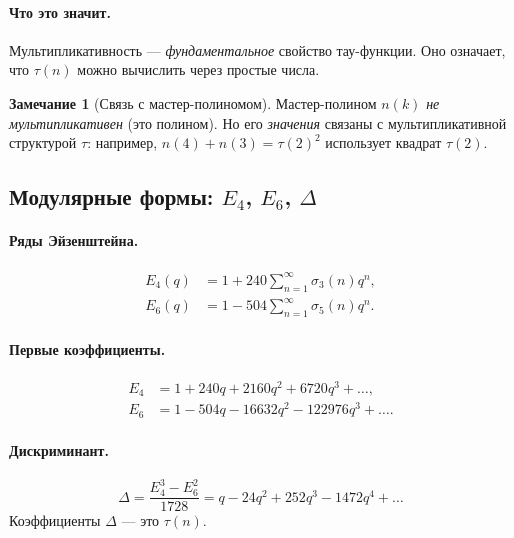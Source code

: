 \documentclass[11pt,a4paper]{article}
\theoremstyle{definition}
\newtheorem{remark}[theorem]{Замечание}
\begin{document}
\paragraph{Что это значит.}
Мультипликативность — \emph{фундаментальное} свойство 
тау-функции. Оно означает, что $\tau(n)$ можно вычислить 
через простые числа.

\begin{remark}[Связь с мастер-полиномом]
\label{rem:master-tau-multiplicative}
Мастер-полином $n(k)$ \emph{не мультипликативен} (это 
полином). Но его \emph{значения} связаны с мультипликативной 
структурой $\tau$: например, $n(4) + n(3) = \tau(2)^2$ 
использует квадрат $\tau(2)$.
\end{remark}

\subsection{Модулярные формы: $E_4$, $E_6$, $\Delta$}
\label{subsec:modular-forms}

\paragraph{Ряды Эйзенштейна.}
\begin{align}
    E_4(q) &= 1 + 240 \sum_{n=1}^{\infty} \sigma_3(n) q^n, \\
    E_6(q) &= 1 - 504 \sum_{n=1}^{\infty} \sigma_5(n) q^n.
\end{align}

\paragraph{Первые коэффициенты.}
\begin{align}
    E_4 &= 1 + 240 q + 2160 q^2 + 6720 q^3 + \ldots, \\
    E_6 &= 1 - 504 q - 16632 q^2 - 122976 q^3 + \ldots.
\end{align}

\paragraph{Дискриминант.}
\begin{equation}
    \Delta = \frac{E_4^3 - E_6^2}{1728} 
    = q - 24 q^2 + 252 q^3 - 1472 q^4 + \ldots
\end{equation}
Коэффициенты $\Delta$ — это $\tau(n)$.
\end{document}
